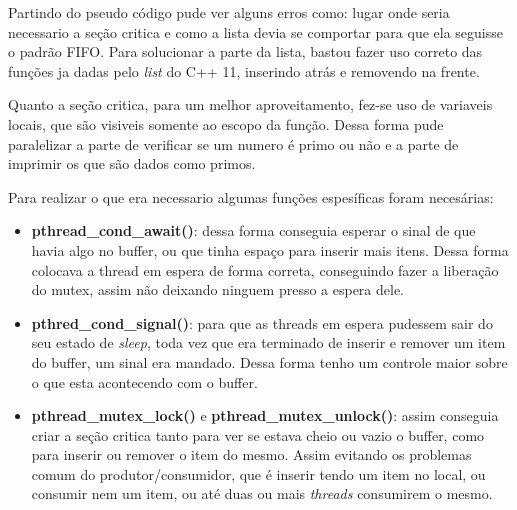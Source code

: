 \documentclass[12pt]{article}
\begin{document}

Partindo do pseudo código pude ver alguns erros como: lugar onde seria necessario a seção critica e como a lista devia se comportar para que ela seguisse o padrão FIFO. Para solucionar a parte da lista, bastou fazer uso correto das funções ja dadas pelo \textit{list} do C++ 11, inserindo atrás e removendo na frente.

Quanto a seção critica, para um melhor aproveitamento, fez-se uso de variaveis locais, que são visiveis somente ao escopo da função. Dessa forma pude paralelizar a parte de verificar se um numero é primo ou não e a parte de imprimir os que são dados como primos. 

Para realizar o que era necessario algumas funções espesíficas foram necesárias: 
\begin{itemize}
    \item \textbf{pthread\_cond\_await()}: dessa forma conseguia esperar o sinal de que havia algo no buffer, ou que tinha espaço para inserir mais itens. Dessa forma colocava a thread em espera de forma correta, conseguindo fazer a liberação do mutex, assim não deixando ninguem presso a espera dele.
    \item \textbf{pthred\_cond\_signal()}: para que as threads em espera pudessem sair do seu estado de \textit{sleep}, toda vez que era terminado de inserir e remover um item do buffer, um sinal era mandado. Dessa forma tenho um controle maior sobre o que esta acontecendo com o buffer.
    \item \textbf{pthread\_mutex\_lock()} e \textbf{pthread\_mutex\_unlock()}: assim conseguia criar a seção critica tanto para ver se estava cheio ou vazio o buffer, como para inserir ou remover o item do mesmo. Assim evitando os problemas comum do produtor/consumidor, que é inserir tendo um item no local, ou consumir nem um item, ou até duas ou mais \textit{threads} consumirem o mesmo.    
\end{itemize}
\end{document}
